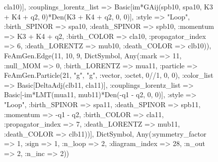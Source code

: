 \documentclass{revtex4}
\begin{document}
\begin{figure}[!htb]
\begin{center}
{cla10)], :couplings_lorentz_list => Basic[im*GAij(spb10, spa10, K3 + K4 + q2, 0)*Den(K3 + K4 + q2, 0, 0)], :style => "Loop", :birth_SPINOR => spa10, :death_SPINOR => spb10, :momentum => K3 + K4 + q2, :birth_COLOR => cla10, :propagator_index => 6, :death_LORENTZ => mub10, :death_COLOR => clb10)), FeAmGen.Edge(11, 10, 9, Dict{Symbol, Any}(:mark => 11, :null_MOM => 0, :birth_LORENTZ => mua11, :particle => FeAmGen.Particle(21, "g", "g", :vector, :octet, 0//1, 0, 0), :color_list => Basic[DeltaAdj(clb11, cla11)], :couplings_lorentz_list => Basic[-im*LMT(mua11, mub11)*Den(-q1 - q2, 0, 0)], :style => "Loop", :birth_SPINOR => spa11, :death_SPINOR => spb11, :momentum => -q1 - q2, :birth_COLOR => cla11, :propagator_index => 7, :death_LORENTZ => mub11, :death_COLOR => clb11))], Dict{Symbol, Any}(:symmetry_factor => 1, :sign => 1, :n_loop => 2, :diagram_index => 28, :n_out => 2, :n_inc => 2)) 
}
\end{center}
\end{figure}
\end{document}
